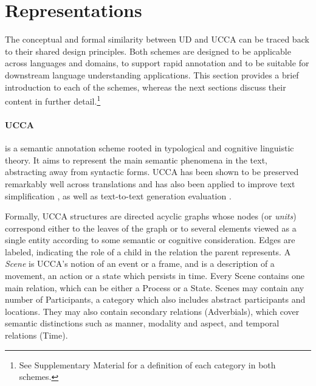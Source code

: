 \documentclass[11pt,a4paper]{article}
\begin{document}

\section{Representations}\label{sec:representations}

  The conceptual and formal similarity between UD and UCCA can be traced back
  to their shared design principles.
  Both schemes are designed to be applicable across languages and domains, 
  to support rapid annotation and to be suitable for downstream language understanding
  applications. This section provides a brief introduction to each of the schemes, whereas
  the next sections discuss their content in further
  detail.\footnote{See Supplementary Material for a definition of each category in both schemes.}
  


\paragraph{UCCA}\label{sec:ucca}
  \citep[Universal Cognitive Conceptual Annotation;][]{abend2013universal} is a semantic annotation scheme rooted in typological 
  and cognitive linguistic theory.
  It aims to represent the main semantic phenomena in the text, abstracting away from syntactic forms.
  UCCA has been shown to be preserved remarkably well across translations \citep{sulem2015conceptual} and has also been applied to
  improve text simplification \citep{sulem2018simple},
  as well as text-to-text generation evaluation \citep{birch2016hume,choshen2018usim,sulem2018samsa}.

  Formally, UCCA structures are directed acyclic graphs whose nodes (or {\it units}) correspond either to the leaves of the graph %
  or to several elements viewed as a single entity according to some semantic or cognitive consideration.
  Edges are labeled, indicating the role of a child in the relation the parent represents.
  A {\it Scene} is UCCA's notion of an event or a frame, and is a description of a movement, an action or a state which persists in time. 
  Every Scene contains one main relation, which can be either a Process or a State. 
  Scenes may contain any number of Participants, a category which also includes abstract participants and locations.
  They may also contain secondary relations (Adverbials), which cover semantic distinctions such as manner, modality and aspect,
  and temporal relations (Time).
\end{document}
